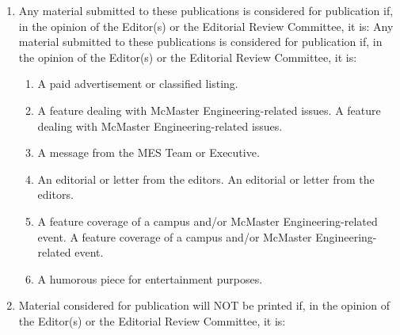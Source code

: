 \begin{enumerate}
 \item
  Any material submitted to these publications is considered for publication if, in the opinion of the Editor(s) or the Editorial Review Committee, it is:
  Any material submitted to these publications is considered for publication if, in the opinion of the Editor(s) or the Editorial Review Committee, it is:

  \begin{enumerate}
   \item
    A paid advertisement or classified listing.
   \item
    A feature dealing with McMaster Engineering-related issues.
    A feature dealing with McMaster Engineering-related issues.
   \item
    A message from the MES Team or Executive.
   \item
    An editorial or letter from the editors.
    An editorial or letter from the editors.
   \item
    A feature coverage of a campus and/or McMaster Engineering-related event.
    A feature coverage of a campus and/or McMaster Engineering-related event.
   \item
    A humorous piece for entertainment purposes.
  \end{enumerate}
 \item
  Material considered for publication will NOT be printed if, in the opinion of the Editor(s) or the Editorial Review Committee, it is:


\end{enumerate}
